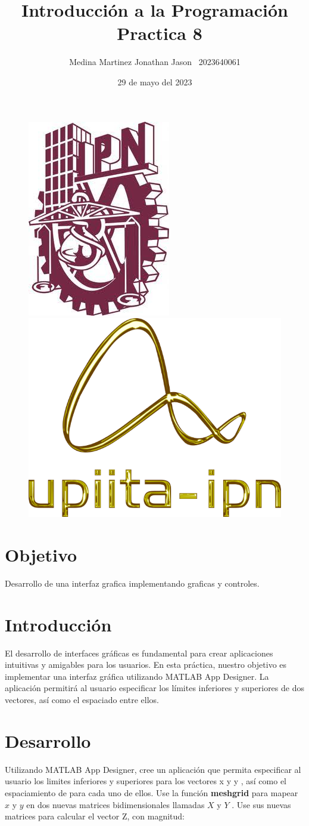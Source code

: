 \documentclass{article}
\title{Introducción a la Programación \ Practica 8}
\author{Medina Martinez Jonathan Jason \ 2023640061}
\date{29 de mayo del 2023}
\begin{document}
	
	\fontsize{12}{16}\selectfont
	
	\begin{figure}[t]
		
		\includegraphics[width=2.5 cm]{Logo1.jpeg}
		\hfill
		\includegraphics[width=3 cm]{Logo2.png}
		
	\end{figure}
	
	\maketitle
	\newpage
	
	\tableofcontents
	\newpage
	
	\section{Objetivo}
	
	Desarrollo de una interfaz grafica implementando graficas y controles.
	
	\section{Introducción}
	
	El desarrollo de interfaces gráficas es fundamental para crear aplicaciones intuitivas y amigables para los usuarios. En esta práctica, nuestro objetivo es implementar una interfaz gráfica utilizando MATLAB App Designer. La aplicación permitirá al usuario especificar los límites inferiores y superiores de dos vectores, así como el espaciado entre ellos.
	
	\newpage
	\section{Desarrollo}
	
	Utilizando MATLAB App Designer, cree un aplicación que permita especificar al usuario los limites inferiores y superiores para los vectores x y y , así como el espaciamiento de para cada uno de ellos. Use la función \textbf{meshgrid} para mapear $x$ y $y$ en dos nuevas matrices bidimensionales llamadas $X$ y $Y$ . Use sus nuevas matrices para calcular el vector Z, con magnitud:
	
\end{document}
